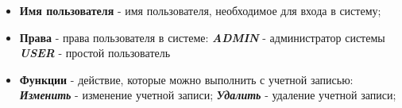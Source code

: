 \documentclass[a4paper]{article}
\begin{document}
\begin{itemize}
\setlength{\itemsep}{-2mm}
	\item \textbf{Имя пользователя} - имя пользователя, необходимое для входа в систему;
	\item \textbf{Права} - права пользователя в системе:
		\subitem \textbf{\textit{ADMIN}} -  администратор системы
		\subitem \textbf{\textit{USER}} - простой пользователь
	\item \textbf{Функции} -  действие, которые можно выполнить с учетной записью:
		\subitem \textbf{\textit{Изменить}} - изменение учетной записи;
		\subitem \textbf{\textit{Удалить}} - удаление учетной записи;
\end{itemize}
\end{document}
